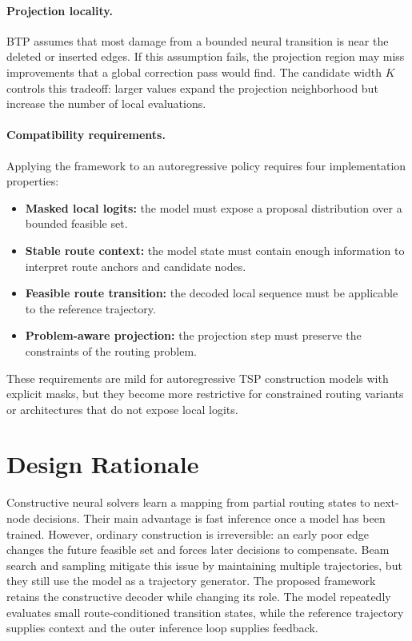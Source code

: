 \documentclass[11pt]{article}
\newcommand{\TSP}{\textsc{TSP}}
\newcommand{\BTP}{\textsc{BTP}}
\begin{document}
\paragraph{Projection locality.}
\BTP{} assumes that most damage from a bounded neural transition is near the deleted or inserted edges. If this assumption fails, the projection region may miss improvements that a global correction pass would find. The candidate width $K$ controls this tradeoff: larger values expand the projection neighborhood but increase the number of local evaluations.

\paragraph{Compatibility requirements.}
Applying the framework to an autoregressive policy requires four implementation properties:
\begin{itemize}[leftmargin=*,noitemsep]
  \item \textbf{Masked local logits:} the model must expose a proposal distribution over a bounded feasible set.
  \item \textbf{Stable route context:} the model state must contain enough information to interpret route anchors and candidate nodes.
  \item \textbf{Feasible route transition:} the decoded local sequence must be applicable to the reference trajectory.
  \item \textbf{Problem-aware projection:} the projection step must preserve the constraints of the routing problem.
\end{itemize}
These requirements are mild for autoregressive \TSP{} construction models with explicit masks, but they become more restrictive for constrained routing variants or architectures that do not expose local logits.

\section{Design Rationale}

Constructive neural solvers learn a mapping from partial routing states to next-node decisions. Their main advantage is fast inference once a model has been trained. However, ordinary construction is irreversible: an early poor edge changes the future feasible set and forces later decisions to compensate. Beam search and sampling mitigate this issue by maintaining multiple trajectories, but they still use the model as a trajectory generator. The proposed framework retains the constructive decoder while changing its role. The model repeatedly evaluates small route-conditioned transition states, while the reference trajectory supplies context and the outer inference loop supplies feedback.
\end{document}
